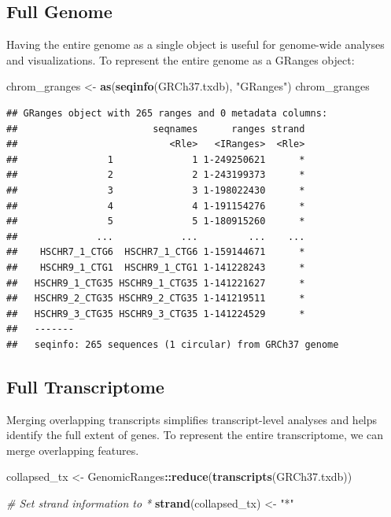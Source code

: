 \documentclass[
]{book}
\newenvironment{Shaded}{\begin{snugshade}}{\end{snugshade}}
\newcommand{\CommentTok}[1]{\textcolor[rgb]{0.56,0.35,0.01}{\textit{#1}}}
\newcommand{\FunctionTok}[1]{\textcolor[rgb]{0.13,0.29,0.53}{\textbf{#1}}}
\newcommand{\NormalTok}[1]{#1}
\newcommand{\OtherTok}[1]{\textcolor[rgb]{0.56,0.35,0.01}{#1}}
\newcommand{\SpecialCharTok}[1]{\textcolor[rgb]{0.81,0.36,0.00}{\textbf{#1}}}
\newcommand{\StringTok}[1]{\textcolor[rgb]{0.31,0.60,0.02}{#1}}
\begin{document}
\hypertarget{full-genome}{%
\subsection{Full Genome}\label{full-genome}}

Having the entire genome as a single object is useful for genome-wide analyses and visualizations. To represent the entire genome as a GRanges object:

\begin{Shaded}
\begin{Highlighting}[]
\NormalTok{chrom\_granges }\OtherTok{\textless{}{-}} \FunctionTok{as}\NormalTok{(}\FunctionTok{seqinfo}\NormalTok{(GRCh37.txdb), }\StringTok{"GRanges"}\NormalTok{)}
\NormalTok{chrom\_granges}
\end{Highlighting}
\end{Shaded}

\begin{verbatim}
## GRanges object with 265 ranges and 0 metadata columns:
##                        seqnames      ranges strand
##                           <Rle>   <IRanges>  <Rle>
##                1              1 1-249250621      *
##                2              2 1-243199373      *
##                3              3 1-198022430      *
##                4              4 1-191154276      *
##                5              5 1-180915260      *
##              ...            ...         ...    ...
##    HSCHR7_1_CTG6  HSCHR7_1_CTG6 1-159144671      *
##    HSCHR9_1_CTG1  HSCHR9_1_CTG1 1-141228243      *
##   HSCHR9_1_CTG35 HSCHR9_1_CTG35 1-141221627      *
##   HSCHR9_2_CTG35 HSCHR9_2_CTG35 1-141219511      *
##   HSCHR9_3_CTG35 HSCHR9_3_CTG35 1-141224529      *
##   -------
##   seqinfo: 265 sequences (1 circular) from GRCh37 genome
\end{verbatim}

\hypertarget{full-transcriptome}{%
\subsection{Full Transcriptome}\label{full-transcriptome}}

Merging overlapping transcripts simplifies transcript-level analyses and helps identify the full extent of genes. To represent the entire transcriptome, we can merge overlapping features.

\begin{Shaded}
\begin{Highlighting}[]
\NormalTok{collapsed\_tx }\OtherTok{\textless{}{-}}\NormalTok{ GenomicRanges}\SpecialCharTok{::}\FunctionTok{reduce}\NormalTok{(}\FunctionTok{transcripts}\NormalTok{(GRCh37.txdb))}

\CommentTok{\# Set strand information to \textquotesingle{}*\textquotesingle{}}
\FunctionTok{strand}\NormalTok{(collapsed\_tx) }\OtherTok{\textless{}{-}} \StringTok{"*"}
\end{Highlighting}
\end{Shaded}
\end{document}
